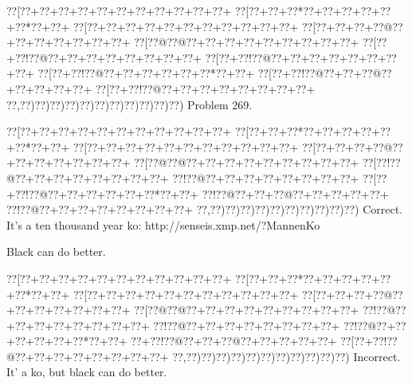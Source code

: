 \documentclass[a5paper]{article}
\begin{document}
\newpage
\begin{center}
{\goo
\0??[\0??+\0??+\0??+\0??+\0??+\0??+\0??+\0??+\0??+\0??+\0??+
\0??[\0??+\0??+\0??*\0??+\0??+\0??+\0??+\0??+\0??*\0??+\0??+
\0??[\0??+\0??+\0??+\0??+\0??+\0??+\0??+\0??+\0??+\0??+\0??+
\0??[\0??+\0??+\0??+\0??@\0??+\0??+\0??+\0??+\0??+\0??+\0??+
\0??[\0??@\0??@\0??+\0??+\0??+\0??+\0??+\0??+\0??+\0??+\0??+
\0??[\0??+\0??!\0??@\0??+\0??+\0??+\0??+\0??+\0??+\0??+\0??+
\0??[\0??+\0??!\0??@\0??+\0??+\0??+\0??+\0??+\0??+\0??+\0??+
\0??[\0??+\0??!\0??@\0??+\0??+\0??+\0??+\0??+\0??*\0??+\0??+
\0??[\0??+\0??!\0??@\0??+\0??+\0??@\0??+\0??+\0??+\0??+\0??+
\0??[\0??+\0??!\0??@\0??+\0??+\0??+\0??+\0??+\0??+\0??+\0??+
\0??,\0??)\0??)\0??)\0??)\0??)\0??)\0??)\0??)\0??)\0??)\0??)
}
Problem 269.

\end{center}
\begin{center}
{\goo
\0??[\0??+\0??+\0??+\0??+\0??+\0??+\0??+\0??+\0??+\0??+\0??+
\0??[\0??+\0??+\0??*\0??+\0??+\0??+\0??+\0??+\0??*\0??+\0??+
\0??[\0??+\0??+\0??+\0??+\0??+\0??+\0??+\0??+\0??+\0??+\0??+
\0??[\0??+\0??+\0??+\0??@\0??+\0??+\0??+\0??+\0??+\0??+\0??+
\0??[\0??@\0??@\0??+\0??+\0??+\0??+\0??+\0??+\0??+\0??+\0??+
\0??[\0??!\0??@\0??+\0??+\0??+\0??+\0??+\0??+\0??+\0??+
\0??!\0??@\0??+\0??+\0??+\0??+\0??+\0??+\0??+\0??+
\0??[\0??+\0??!\0??@\0??+\0??+\0??+\0??+\0??+\0??*\0??+\0??+
\0??!\0??@\0??+\0??+\0??@\0??+\0??+\0??+\0??+\0??+
\0??!\0??@\0??+\0??+\0??+\0??+\0??+\0??+\0??+\0??+
\0??,\0??)\0??)\0??)\0??)\0??)\0??)\0??)\0??)\0??)\0??)
}
Correct. It's a ten thousand year ko: http://senseis.xmp.net/?MannenKo

Black can do better.

\end{center}
\begin{center}
{\goo
\0??[\0??+\0??+\0??+\0??+\0??+\0??+\0??+\0??+\0??+\0??+\0??+
\0??[\0??+\0??+\0??*\0??+\0??+\0??+\0??+\0??+\0??*\0??+\0??+
\0??[\0??+\0??+\0??+\0??+\0??+\0??+\0??+\0??+\0??+\0??+\0??+
\0??[\0??+\0??+\0??+\0??@\0??+\0??+\0??+\0??+\0??+\0??+\0??+
\0??[\0??@\0??@\0??+\0??+\0??+\0??+\0??+\0??+\0??+\0??+\0??+
\0??!\0??@\0??+\0??+\0??+\0??+\0??+\0??+\0??+\0??+
\0??!\0??@\0??+\0??+\0??+\0??+\0??+\0??+\0??+\0??+
\0??!\0??@\0??+\0??+\0??+\0??+\0??+\0??*\0??+\0??+
\0??+\0??!\0??@\0??+\0??+\0??@\0??+\0??+\0??+\0??+\0??+
\0??[\0??+\0??!\0??@\0??+\0??+\0??+\0??+\0??+\0??+\0??+\0??+
\0??,\0??)\0??)\0??)\0??)\0??)\0??)\0??)\0??)\0??)\0??)\0??)
}
Incorrect. It' a ko, but black can do better.

\end{center}
\end{document}

